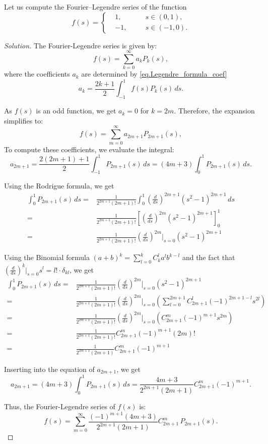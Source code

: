\begin{example}[]\label{ex.Fourier_Legendre_1}
Let us compute the Fourier--Legendre series of the function 
$$
f(s)=\left\{\begin{aligned}
    &1, &&s\in (0, 1),
    \\ 
    &-1,\quad &&s\in (-1, 0).
\end{aligned}\right.
$$
\end{example}
\begin{proof}[Solution] The Fourier-Legendre series is given by:
\[
f(s) = \sum_{k=0}^\infty a_k P_k(s),
\]
where the coefficients \( a_k \) are determined by \eqref{eq.Legendre_formula_coef}
\[
a_k = \frac{2k + 1}{2} \int_{-1}^1 f(s) P_k(s) \, ds.
\]

As \( f(s) \) is an odd function, we get $a_k = 0$ for $k = 2m$. Therefore, the expansion simplifies to:
\[
f(s) = \sum_{m=0}^\infty a_{2m+1} P_{2m+1}(s),
\]
To compute these coefficients, we evaluate the integral:
\[
a_{2m+1} = \frac{2(2m+1) + 1}{2} \int_{-1}^1 P_{2m+1}(s) \, ds = (4m + 3) \int_0^1 P_{2m+1}(s) \, ds.
\]

Using the Rodrigue formula, we get 
\[
\begin{split}
    \int_0^1 P_{2m+1}(s) \, ds =& \frac{1}{2^{2m+1} (2m+1)!} \int_0^1 \left(\frac{d}{d s}\right)^{2m+1}\left(s^2-1\right)^{2m+1} \, ds 
    \\
    =& \frac{1}{2^{2m+1} (2m+1)!} \left[\left(\frac{d}{d s}\right)^{2m}\left(s^2-1\right)^{2m+1}\right]_0^1 
    \\
    =& \frac{1}{2^{2m+1} (2m+1)!} \left(\frac{d}{d s}\right)^{2m}\bigg|_{s = 0}\left(s^2-1\right)^{2m+1}
\end{split}
\]

Using the Binomial formula $(a + b)^k = \sum_{l = 0}^k C_k^l a^l b^{k - l}$ and the fact that $\left(\frac{d}{d s}\right)^k\Big|_{s = 0} s^l = l!\cdot \delta_{kl}$, we get 
\[
\begin{split}
    \int_0^1 P_{2m+1}(s) \, ds
    =& \frac{1}{2^{2m+1} (2m+1)!} \left(\frac{d}{d s}\right)^{2m}\bigg|_{s = 0}\left(s^2-1\right)^{2m+1}
    \\
    =& \frac{1}{2^{2m+1} (2m+1)!} \left(\frac{d}{d s}\right)^{2m}\bigg|_{s = 0}\left(\sum_{l = 0}^{2m+1} C_{2m+1}^l (-1)^{2m+1-l}s^{2l}\right)
    \\
    =& \frac{1}{2^{2m+1} (2m+1)!} \left(\frac{d}{d s}\right)^{2m}\bigg|_{s = 0}\left(C_{2m+1}^{m} (-1)^{m+1}s^{2m}\right) 
    \\
    =& \frac{1}{2^{2m+1} (2m+1)!} C_{2m+1}^{m} (-1)^{m+1} (2m)!
    \\
    =& \frac{1}{2^{2m+1} (2m+1)} C_{2m+1}^{m} (-1)^{m+1} 
\end{split}
\]

Inserting into the equation of $a_{2m+1}$, we get 
\[
a_{2m+1} = (4m + 3) \int_0^1 P_{2m+1}(s) \, ds = \frac{4m + 3}{2^{2m+1} (2m+1)} C_{2m+1}^{m} (-1)^{m+1}.
\]

Thus, the Fourier-Legendre series of \( f(s) \) is:
\[
f(s) = \sum_{m=0}^\infty \frac{(-1)^{m+1}(4m + 3)}{2^{2m+1} (2m+1)} C_{2m+1}^{m} \, P_{2m+1}(s).
\]

\end{proof}



